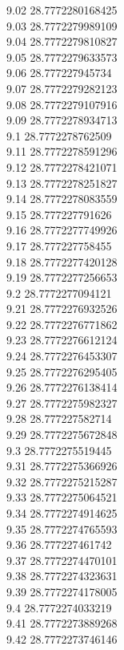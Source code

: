 {9.02	28.7772280168425\\
9.03	28.7772279989109\\
9.04	28.7772279810827\\
9.05	28.7772279633573\\
9.06	28.777227945734\\
9.07	28.7772279282123\\
9.08	28.7772279107916\\
9.09	28.7772278934713\\
9.1	28.7772278762509\\
9.11	28.7772278591296\\
9.12	28.7772278421071\\
9.13	28.7772278251827\\
9.14	28.7772278083559\\
9.15	28.777227791626\\
9.16	28.7772277749926\\
9.17	28.777227758455\\
9.18	28.7772277420128\\
9.19	28.7772277256653\\
9.2	28.7772277094121\\
9.21	28.7772276932526\\
9.22	28.7772276771862\\
9.23	28.7772276612124\\
9.24	28.7772276453307\\
9.25	28.7772276295405\\
9.26	28.7772276138414\\
9.27	28.7772275982327\\
9.28	28.777227582714\\
9.29	28.7772275672848\\
9.3	28.7772275519445\\
9.31	28.7772275366926\\
9.32	28.7772275215287\\
9.33	28.7772275064521\\
9.34	28.7772274914625\\
9.35	28.7772274765593\\
9.36	28.777227461742\\
9.37	28.7772274470101\\
9.38	28.7772274323631\\
9.39	28.7772274178005\\
9.4	28.7772274033219\\
9.41	28.7772273889268\\
9.42	28.7772273746146\\
}
